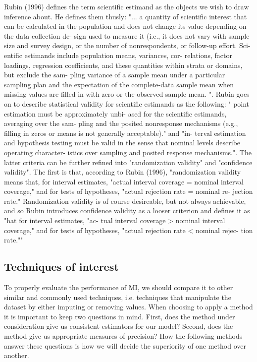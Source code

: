 \documentclass{article}
\begin{document}
	Rubin (1996) defines the term scientific estimand as the objects we wish to draw inference about. He defines them thusly: "... a quantity of scientific
	interest that can be calculated in the population and does
	not change its value depending on the data collection de-
	sign used to measure it (i.e., it does not vary with sample
	size and survey design, or the number of nonrespondents,
	or follow-up effort. Sci-
	entific estimands include population means, variances, cor-
	relations, factor loadings, regression coefficients, and these
	quantities within strata or domains, but exclude the sam-
	pling variance of a sample mean under a particular sampling
	plan and the expectation of the complete-data sample mean
	when missing values are filled in with zero or the observed sample mean. ". Rubin goes on to describe statistical validity for scientific estimands as the following: " point estimation must be approximately unbi-
	ased for the scientific estimands, averaging over the sam-
	pling and the posited nonresponse mechanisms (e.g., filling
	in zeros or means is not generally acceptable)." and "in-
	terval estimation and hypothesis testing must be valid in
	the sense that nominal levels describe operating character-
	istics over sampling and posited response mechanisms.". The latter criteria can be further refined into "randomization validity" and "confidence validity". The first is that, according to Rubin (1996),  "randomization validity means that, for interval estimates,
	"actual interval coverage = nominal interval coverage," and
	for tests of hypotheses, "actual rejection rate = nominal re-
	jection rate."  Randomization validity is of course desireable, but not always achievable, and so Rubin introduces confidence validity as a looser criterion and defines it as "hat for interval estimates, "ac-
	tual interval coverage > nominal interval coverage," and for
	tests of hypotheses, "actual rejection rate < nominal rejec-
	tion rate."" 
	
	
	\subsection{Techniques of interest}
	To properly evaluate the performance of MI, we should compare it to other similar and commonly used techniques, i.e. techniques that manipulate the dataset by either imputing or removing values. When choosing to apply a method it is important to keep two questions in mind. First, does the method under consideration give us consistent estimators for our model? Second, does the method give us appropriate measures of precision? How the following methods answer these questions is how we will decide the superiority of one method over another.
	
\end{document}
